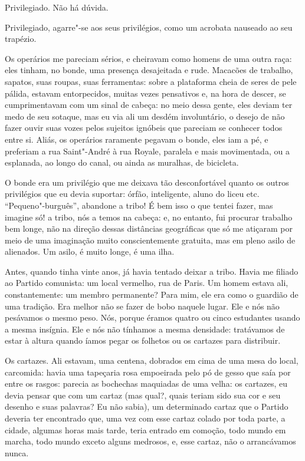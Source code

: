 Privilegiado. Não há dúvida.

Privilegiado, agarre"-se aos seus privilégios, como um acrobata nauseado
ao seu trapézio.

Os operários me pareciam sérios, e cheiravam como homens de uma outra
raça: eles tinham, no bonde, uma presença desajeitada e rude. Macacões
de trabalho, sapatos, suas roupas, suas ferramentas: sobre a plataforma
cheia de seres de pele pálida, estavam entorpecidos, muitas vezes
pensativos e, na hora de descer, se cumprimentavam com um sinal de
cabeça: no meio dessa gente, eles deviam ter medo de seu sotaque, mas eu
via ali um desdém involuntário, o desejo de não fazer ouvir suas vozes
pelos sujeitos ignóbeis que pareciam se conhecer todos entre si. Aliás,
os operários raramente pegavam o bonde, eles iam a pé, e preferiam a rua
Saint"-André à rua Royale, paralela e mais movimentada, ou a esplanada,
ao longo do canal, ou ainda as muralhas, de bicicleta.

O bonde era um privilégio que me deixava tão desconfortável quanto os
outros privilégios que eu devia suportar: órfão, inteligente, aluno do
liceu etc. ``Pequeno"-burguês'', abandone a tribo! É bem isso o que
tentei fazer, mas imagine só! a tribo, nós a temos na cabeça: e, no
entanto, fui procurar trabalho bem longe, não na direção dessas
distâncias geográficas que só me atiçaram por meio de uma imaginação
muito conscientemente gratuita, mas em pleno asilo de alienados. Um
asilo, é muito longe, é uma ilha.

Antes, quando tinha vinte anos, já havia tentado deixar a tribo. Havia
me filiado ao Partido comunista: um local vermelho, rua de Paris. Um
homem estava ali, constantemente: um membro permanente? Para mim, ele
era como o guardião de uma tradição. Era melhor não se fazer de bobo
naquele lugar. Ele e nós não pesávamos o mesmo peso. Nós, porque éramos
quatro ou cinco estudantes usando a mesma insígnia. Ele e nós não
tínhamos a mesma densidade: tratávamos de estar à altura quando íamos
pegar os folhetos ou os cartazes para distribuir.

Os cartazes. Ali estavam, uma centena, dobrados em cima de uma mesa do
local, carcomida: havia uma tapeçaria rosa empoeirada pelo pó de gesso
que saía por entre os rasgos: parecia as bochechas maquiadas de uma
velha: os cartazes, eu devia pensar que com um cartaz (mas qual?, quais
teriam sido sua cor e seu desenho e suas palavras? Eu não sabia), um
determinado cartaz que o Partido deveria ter encontrado que, uma vez com esse cartaz colado
por toda parte, a cidade, algumas horas mais tarde, teria entrado
em comoção, todo mundo em marcha, todo mundo exceto alguns medrosos, e,
esse cartaz, não o arrancávamos nunca.


